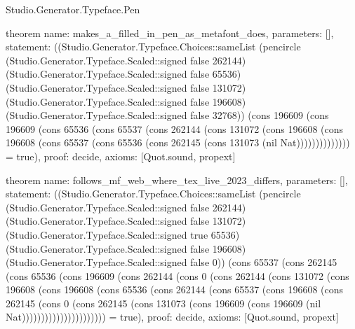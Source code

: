 \begin{lexlean}{Studio.Generator.Typeface.Pen}
\begin{semanticmodule}
theorem{
  name: makes_a_filled_in_pen_as_metafont_does,
  parameters: [],
  statement: ((Studio.Generator.Typeface.Choices::sameList (pencircle (Studio.Generator.Typeface.Scaled::signed false 262144) (Studio.Generator.Typeface.Scaled::signed false 65536) (Studio.Generator.Typeface.Scaled::signed false 131072) (Studio.Generator.Typeface.Scaled::signed false 196608) (Studio.Generator.Typeface.Scaled::signed false 32768)) (cons 196609 (cons 196609 (cons 65536 (cons 65537 (cons 262144 (cons 131072 (cons 196608 (cons 196608 (cons 65537 (cons 65536 (cons 262145 (cons 131073 (nil Nat)))))))))))))) = true),
  proof: decide{},
  axioms: [Quot.sound, propext]
}

theorem{
  name: follows_mf_web_where_tex_live_2023_differs,
  parameters: [],
  statement: ((Studio.Generator.Typeface.Choices::sameList (pencircle (Studio.Generator.Typeface.Scaled::signed false 262144) (Studio.Generator.Typeface.Scaled::signed false 131072) (Studio.Generator.Typeface.Scaled::signed true 65536) (Studio.Generator.Typeface.Scaled::signed false 196608) (Studio.Generator.Typeface.Scaled::signed false 0)) (cons 65537 (cons 262145 (cons 65536 (cons 196609 (cons 262144 (cons 0 (cons 262144 (cons 131072 (cons 196608 (cons 196608 (cons 65536 (cons 262144 (cons 65537 (cons 196608 (cons 262145 (cons 0 (cons 262145 (cons 131073 (cons 196609 (cons 196609 (nil Nat)))))))))))))))))))))) = true),
  proof: decide{},
  axioms: [Quot.sound, propext]
}

\end{semanticmodule}
\end{lexlean}
